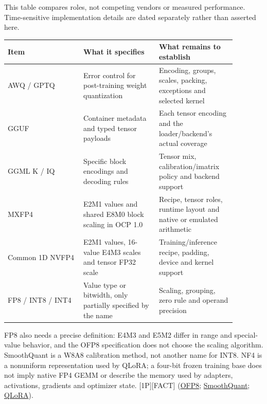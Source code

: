 This table compares roles, not competing vendors or measured
performance. Time-sensitive implementation details are dated separately
rather than asserted here.

\nopagebreak[4]
\begin{longtable}[]{@{}
  >{\raggedright\arraybackslash}p{0.2927\linewidth}
  >{\raggedright\arraybackslash}p{0.2927\linewidth}
  >{\raggedright\arraybackslash}p{0.2927\linewidth}@{}}
\toprule\noalign{}
\begin{minipage}[b]{\linewidth}\raggedright
Item
\end{minipage} & \begin{minipage}[b]{\linewidth}\raggedright
What it specifies
\end{minipage} & \begin{minipage}[b]{\linewidth}\raggedright
What remains to establish
\end{minipage} \\
\midrule\noalign{}
\endhead
\bottomrule\noalign{}
\endlastfoot
AWQ / GPTQ & Error control for post-training weight quantization &
Encoding, groups, scales, packing, exceptions and selected kernel \\
\noalign{\label{tab:7.5}}
GGUF & Container metadata and typed tensor payloads & Each tensor
encoding and the loader/backend's actual coverage \\
GGML K / IQ & Specific block encodings and decoding rules & Tensor mix,
calibration/imatrix policy and backend support \\
MXFP4 & E2M1 values and shared E8M0 block scaling in OCP 1.0 & Recipe,
tensor roles, runtime layout and native or emulated arithmetic \\
Common 1D NVFP4 & E2M1 values, 16-value E4M3 scales and tensor FP32
scale & Training/inference recipe, padding, device and kernel support \\
FP8 / INT8 / INT4 & Value type or bitwidth, only partially specified by
the name & Scaling, grouping, zero rule and operand precision \\
\end{longtable}

FP8 also needs a precise definition: E4M3 and E5M2 differ in range and
special-value behavior, and the OFP8 specification does not choose the
scaling algorithm. SmoothQuant is a W8A8 calibration method, not another
name for INT8. NF4 is a nonuniform representation used by QLoRA; a
four-bit frozen training base does not imply native FP4 GEMM or describe
the memory used by adapters, activations, gradients and optimizer state.
\mbox{{[}1P{]}}\hspace{0pt}\mbox{{[}FACT{]}}
(\href{https://www.opencompute.org/documents/ocp-8-bit-floating-point-specification-ofp8-revision-1-0-2023-12-01-pdf-1}{OFP8};
\href{https://arxiv.org/abs/2211.10438v7}{SmoothQuant};
\href{https://arxiv.org/abs/2305.14314v1}{QLoRA}).

